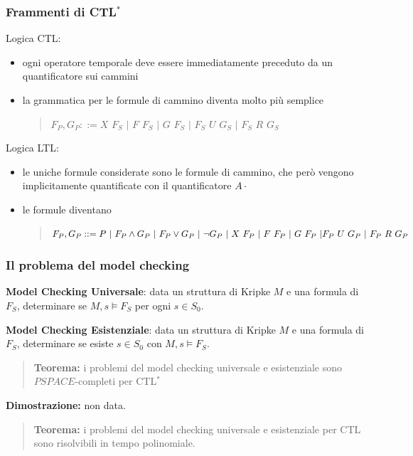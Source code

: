 \documentclass{article}
\begin{document}
\subsubsection{Frammenti di CTL$^*$}
Logica CTL:
\begin{itemize}
    \item ogni operatore temporale deve essere immediatamente preceduto da un quantificatore sui cammini
    \item la grammatica per le formule di cammino diventa molto più semplice
    \begin{quote}
        $F_P,G_P::= X\,\,F_S\,\,|\,\,F\,\,F_S\,\,|\,\,G\,\,F_S\,\,|\,\,F_S\,\,U\,\,G_S\,\,|\,\,F_S\,\,R\,\,G_S$
    \end{quote}
\end{itemize}

\noindent Logica LTL:
\begin{itemize}
    \item le uniche formule considerate sono le formule di cammino, che però vengono implicitamente quantificate con il quantificatore $A\cdot$
    \item le formule diventano
    \begin{quote}
        $F_P,G_P::=P\,\,|\,\,F_P\land G_P\,\,|\,\,F_P\lor G_P\,\,|\,\,\lnot G_P\,\,|\,\,X\,\,F_P\,\,|\,\,F\,\,F_P\,\,|\,\,G\,\,F_P\,\,|\\F_P\,\,U\,\,G_P\,\,|\,\,F_P\,\,R\,\,G_P$
    \end{quote}
\end{itemize}

\subsubsection{Il problema del model checking}
\textbf{Model Checking Universale}: data un struttura di Kripke $M$ e una formula di $F_S$, determinare se $M,s \vDash F_S$ per ogni $s\in S_0$.

\bigskip

\noindent\textbf{Model Checking Esistenziale}: data un struttura di Kripke $M$ e una formula di $F_S$, determinare se esiste $s\in S_0$ con $M,s \vDash F_S$.

\begin{quote}
    \textbf{Teorema:} i problemi del model checking universale e esistenziale sono $PSPACE$-completi per CTL$^*$
\end{quote}

\textbf{Dimostrazione:} non data.

\begin{quote}
    \textbf{Teorema:} i problemi del model checking universale e esistenziale per CTL sono risolvibili in tempo polinomiale.
\end{quote}
\end{document}
